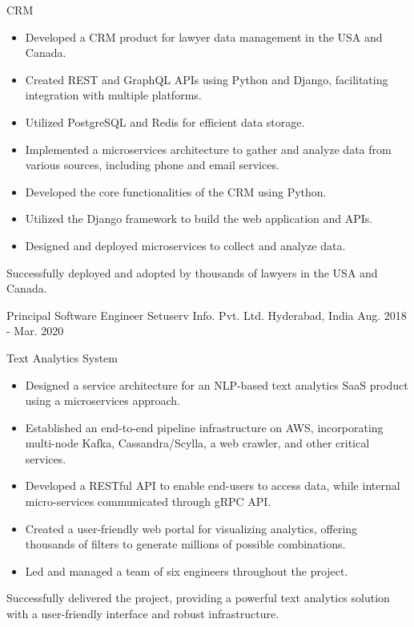 \begin{cventries}
{\begin{cvitems}
	\item {CRM}
      \begin {itemize}
        \item Developed a CRM product for lawyer data management in the USA and Canada.
        \item Created REST and GraphQL APIs using Python and Django, facilitating integration with multiple platforms.
        \item Utilized PostgreSQL and Redis for efficient data storage.
        \item Implemented a microservices architecture to gather and analyze data from various sources, including phone and email services.
        \item Developed the core functionalities of the CRM using Python.
        \item Utilized the Django framework to build the web application and APIs.
        \item Designed and deployed microservices to collect and analyze data.
      \end{itemize}
        Successfully deployed and adopted by thousands of lawyers in the USA and Canada.
      \end{cvitems}
    }
  \cventry
    {Principal Software Engineer} %
    {Setuserv Info. Pvt. Ltd.} %
    {Hyderabad, India} %
    {Aug. 2018 - Mar. 2020} %
    {
      \begin{cvitems} %
        \item {Text Analytics System}
        \begin {itemize}
          \item Designed a service architecture for an NLP-based text analytics SaaS product using a microservices approach.
          \item Established an end-to-end pipeline infrastructure on AWS, incorporating multi-node Kafka, Cassandra/Scylla, a web crawler, and other critical services.
          \item Developed a RESTful API to enable end-users to access data, while internal micro-services communicated through gRPC API.
          \item Created a user-friendly web portal for visualizing analytics, offering thousands of filters to generate millions of possible combinations.
          \item Led and managed a team of six engineers throughout the project.
          \end{itemize}
        Successfully delivered the project, providing a powerful text analytics solution with a user-friendly interface and robust infrastructure.
        \end{cvitems}
    }


\end{cventries}
